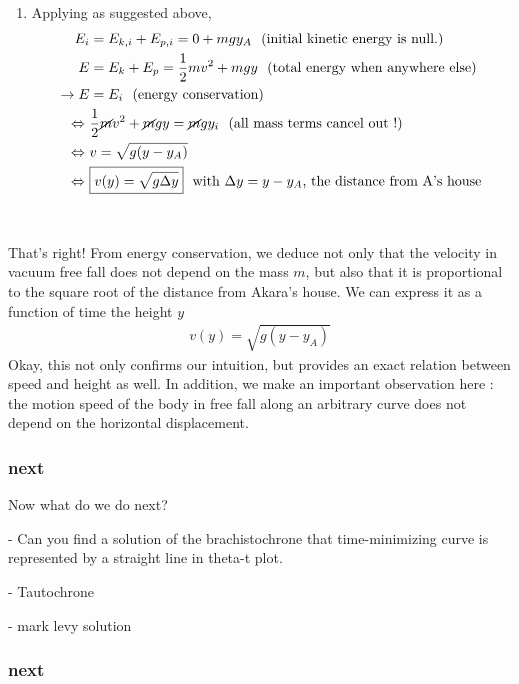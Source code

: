 \documentclass{article}
\begin{document}
\begin{tcolorbox}
\begin{enumerate}
\item Applying as suggested above,
\begin{align}
E_i &= E_{k,i} + E_{p,i}  = 0 + mgy_A ~~\text{(initial kinetic energy is null.)}\nonumber\\
E &= E_{k} + E_{p} = \frac 12  mv^2 + m g y ~~\text{(total energy when anywhere else)}\nonumber\\
\rightarrow E &= E_i \nonumber~~\text{(energy conservation)} \\
\Leftrightarrow~& \frac 12  \cancel{m}v^2 + \cancel{m} g y = \cancel{m}gy_i~~\text{(all mass terms cancel out !)}\nonumber \\
\Leftrightarrow~& v = \sqrt{g (y - y_A)}\nonumber\\
\Leftrightarrow~& \boxed{v(y) = \sqrt{g \Delta y}}\nonumber ~~\text{with $\Delta y=y - y_A$, the distance from A's house}
\end{align}

\end{enumerate}
\end{tcolorbox}
~

That's right! From energy conservation, we deduce not only that the velocity in vacuum free fall does not depend on the mass $m$, but also that it is proportional to the square root of the distance from Akara's house. We can express it as a function of time the height $y$
\begin{align}
  \boxed{v(y) = \sqrt{g (y - y_A)}}
\end{align}
Okay, this not only confirms our intuition, but provides an exact relation between speed and height as well. In addition, we make an important observation here : the motion speed of the body in free fall along an arbitrary curve does not depend on the horizontal displacement.

\subsubsection*{next}




Now what do we do next?


- Can you find a solution of the brachistochrone that time-minimizing curve is represented by a straight line in theta-t plot.

- Tautochrone

- mark levy solution


\subsubsection*{next}
\end{document}

